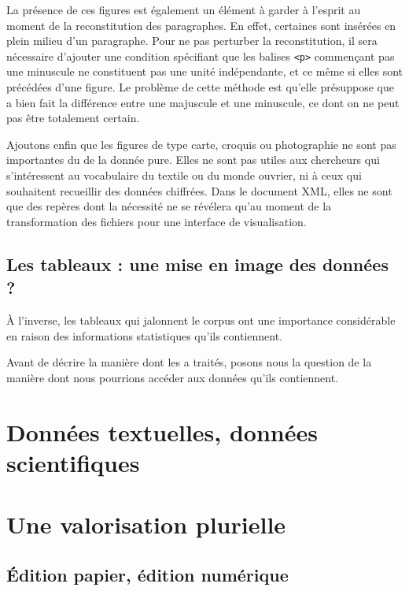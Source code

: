 La présence de ces figures est également un élément à garder à l'esprit au moment de la reconstitution des paragraphes. En effet, certaines sont insérées en plein milieu d'un paragraphe. Pour ne pas perturber la reconstitution, il sera nécessaire d'ajouter une condition spécifiant que les balises \texttt{<p>} commençant pas une minuscule ne constituent pas une unité indépendante, et ce même si elles sont précédées d'une figure. Le problème de cette méthode est qu'elle présuppose que \lse{} a bien fait la différence entre une majuscule et une minuscule, ce dont on ne peut pas 
être totalement certain.

Ajoutons enfin que les figures de type carte, croquis ou photographie ne sont pas importantes du \pov{} de la donnée pure. Elles ne sont pas utiles aux chercheurs qui s'intéressent au vocabulaire du textile ou du monde ouvrier, ni à ceux qui souhaitent recueillir des données chiffrées. Dans le document XML, elles ne sont que des repères dont la nécessité ne se révélera qu'au moment de la transformation des fichiers pour une interface de visualisation.

\section{Les tableaux : une mise en image des données ?}

À l'inverse, les tableaux qui jalonnent le corpus ont une importance considérable en raison des informations statistiques qu'ils contiennent.

Avant de décrire la manière dont \lse{} les a traités, posons nous la question de la manière dont nous pourrions accéder aux données qu'ils contiennent.

\chapter{Données textuelles, données scientifiques}

\chapter{Une valorisation plurielle}

\section{Édition papier, édition numérique}

